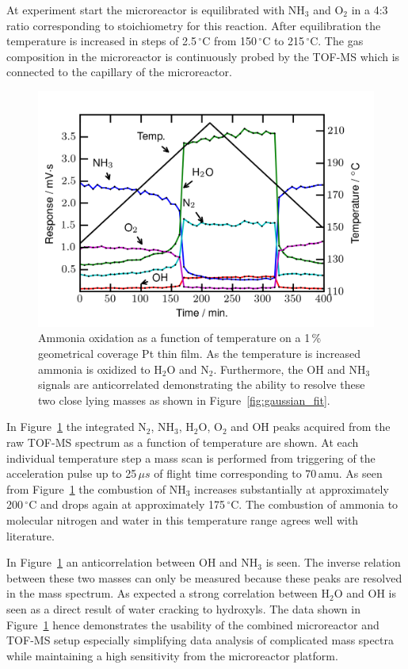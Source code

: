 \documentclass[aip,rsi]{revtex4-1}
\begin{document}
At experiment start the microreactor is equilibrated with NH$_3$ and O$_2$ in a 4:3 ratio corresponding to stoichiometry for this reaction. After equilibration the temperature is increased in steps of 2.5\,$^{\circ}$C from 150\,$^{\circ}$C to 215\,$^{\circ}$C. The gas composition in the microreactor is continuously probed by the TOF-MS which is connected to the capillary of the microreactor.
\begin{figure}
 \includegraphics[width=14cm]{ammonia_reactivity.png}%
 \caption{Ammonia oxidation as a function of temperature on a 1\,\% geometrical coverage Pt thin film. As the temperature is increased ammonia is oxidized to H$_2$O and N$_2$. Furthermore, the OH and NH$_3$ signals are anticorrelated demonstrating the ability to resolve these two close lying masses as shown in Figure~\ref{fig:gaussian_fit}.\label{fig:ammonia_reactivity}}%
\end{figure}
In Figure~\ref{fig:ammonia_reactivity} the integrated N$_2$, NH$_3$, H$_2$O, O$_2$ and OH peaks acquired from the raw TOF-MS spectrum as a function of temperature are shown. At each individual temperature step a mass scan is performed from triggering of the acceleration pulse up to 25\,$\mu s$ of flight time corresponding to 70\,amu. As seen from Figure~\ref{fig:ammonia_reactivity} the combustion of NH$_3$ increases substantially at approximately 200\,$^{\circ}$C and drops again at approximately 175\,$^{\circ}$C. The combustion of ammonia to molecular nitrogen and water in this temperature range agrees well with literature\cite{Imbihl2007,Zeng2009}. 

In Figure~\ref{fig:ammonia_reactivity} an anticorrelation between OH and NH$_3$ is seen. The inverse relation between these two masses can only be measured because these peaks are resolved in the mass spectrum. As expected a strong correlation between H$_2$O and OH is seen as a direct result of water cracking to hydroxyls. The data shown in Figure~\ref{fig:ammonia_reactivity} hence demonstrates the usability of the combined microreactor and TOF-MS setup especially simplifying data analysis of complicated mass spectra while maintaining a high sensitivity from the microreactor platform.
\end{document}
